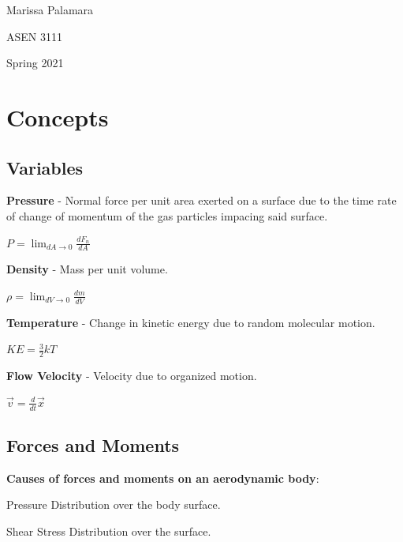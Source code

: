 \documentclass{article}
\begin{document}
\begin{multicols*}{3}
    Marissa Palamara\par 
    ASEN 3111\par 
    Spring 2021
    \vspace{-0.5cm}

\section*{Concepts}

\subsection*{Variables}
\textbf{Pressure} - Normal force per unit area exerted on a surface due to the time rate of change of momentum of the gas particles impacing said surface.\par
$P = \lim_{dA\to 0}\frac{dF_n}{dA}$\par
\textbf{Density} - Mass per unit volume.\par
$\rho = \lim_{dV\to 0} \frac{dm}{dV}$\par
\textbf{Temperature} - Change in kinetic energy due to random molecular motion.\par
$KE = \frac{3}{2}kT$\par
\textbf{Flow Velocity} - Velocity due to organized motion.\par
$\vec{v} = \frac{d}{dt}\vec{x}$\par

\subsection*{Forces and Moments}
\textbf{Causes of forces and moments on an aerodynamic body}:\par
Pressure Distribution over the body surface.\par
Shear Stress Distribution over the surface.\par


\end{multicols*}
\end{document}
